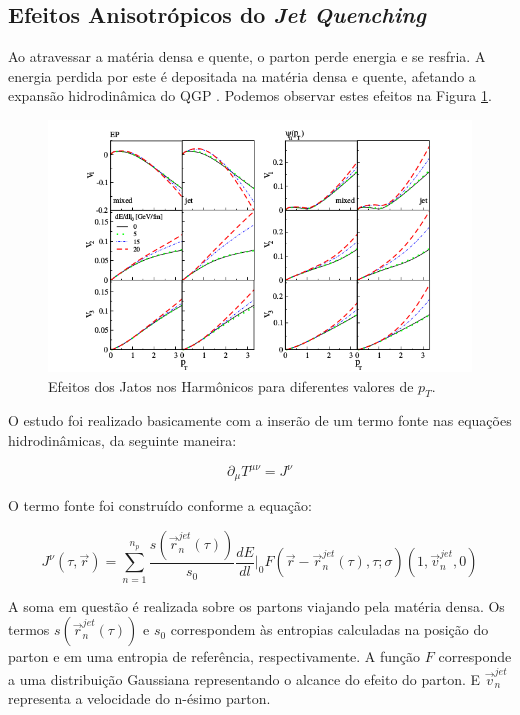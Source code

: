 \subsection{Efeitos Anisotrópicos do {\it Jet Quenching}} \label{ef_an}

Ao atravessar a matéria densa e quente, o parton perde energia e se resfria. A energia perdida
por este é depositada na matéria densa e quente, afetando a expansão hidrodinâmica do QGP
\cite{andrade_jet_2014}. Podemos observar estes efeitos na Figura \ref{fig:v2}.

\begin{figure}[!htb]
\centering
 \includegraphics[scale=0.4]{Introducao/v2.png}
 \caption{Efeitos dos Jatos nos Harmônicos para diferentes valores de $p_{T}$.}
 \label{fig:v2}
\end{figure}

O estudo foi realizado basicamente com a inserão de um termo fonte nas equações hidrodinâmicas, da seguinte maneira:

\begin{equation}
 \partial_{\mu} T^{\mu \nu} = J^{\nu}
\end{equation}

O termo fonte foi construído conforme a equação:

\begin{equation}
 J^{\nu}(\tau,\overrightarrow{r}) = \sum_{n=1}^{n_p} \frac{s(\overrightarrow{r}^{jet}_{n}(\tau))}{s_0} \frac{dE}{dl}\bigg|_0
 F(\overrightarrow{r}-\overrightarrow{r}^{jet}_{n}(\tau),\tau;\sigma)(1,\overrightarrow{v}^{jet}_{n},0)
\end{equation}

A soma em questão é realizada sobre os partons viajando pela matéria densa. Os termos $s(\overrightarrow{r}^{jet}_{n}(\tau))$ e $s_0$
correspondem às entropias calculadas na posição do parton e em uma entropia de referência, respectivamente. A função $F$ corresponde a uma
distribuição Gaussiana representando o alcance do efeito do parton. E $\overrightarrow{v}^{jet}_{n}$ representa a velocidade do n-ésimo
parton.